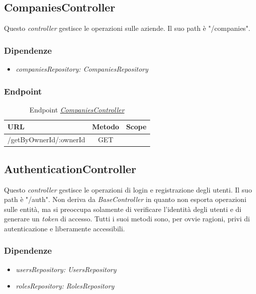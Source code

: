 \subsection{CompaniesController}

Questo \textit{controller} gestisce le operazioni sulle aziende. Il suo path è "/companies".

\subsubsection{Dipendenze}
\begin{itemize}[itemsep=0pt]
	\item \textit{companiesRepository: CompaniesRepository}
\end{itemize}

\subsubsection{Endpoint}

\label{server:companies-controller}
\begin{table}[H]
	\ttfamily
	\caption{Endpoint \hyperref[server:companies-controller]{\textit{CompaniesController}}}
	\centering
	\label{table:api:companies-controller}
	\begin{tabular}{l c c}    
		URL  & Metodo & Scope \\ 
		\midrule
		/getByOwnerId/:ownerId & GET    \\
		\bottomrule
	\end{tabular}
\end{table}

\subsection{AuthenticationController}

Questo \textit{controller} gestisce le operazioni di login e registrazione degli utenti. Il suo path è "/auth". Non deriva da \textit{BaseController} in quanto non esporta operazioni sulle entità, ma si preoccupa solamente di verificare l'identità degli utenti e di generare un \textit{token} di accesso. Tutti i suoi metodi sono, per ovvie ragioni, privi di autenticazione e liberamente accessibili.

\subsubsection{Dipendenze}
\begin{itemize}[itemsep=0pt]
	\item \textit{usersRepository: UsersRepository}
	\item \textit{rolesRepository: RolesRepository}
\end{itemize}

